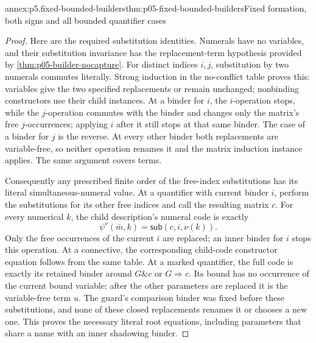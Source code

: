 \begin{annexitem}{annex:p5.fixed-bounded-builders}{thm:p05-fixed-bounded-builders}{Fixed formation, both signs and all bounded quantifier cases}
\begin{proof}
Here are the required substitution identities. Numerals have no variables,
and their substitution invariance has the replacement-term hypothesis
provided by \cref{thm:p05-builder-nocapture}. For distinct indices
\(i,j\), substitution by two numerals commutes literally. Strong
induction in the no-conflict table proves this: variables give the two
specified replacements or remain unchanged; nonbinding constructors use
their child instances. At a binder for \(i\), the \(i\)-operation
stops, while the \(j\)-operation commutes with the binder and changes
only the matrix's free \(j\)-occurrences; applying \(i\) after it
still stops at that same binder. The case of a binder for \(j\) is
the reverse. At every other binder both replacements are variable-free,
so neither operation renames it and the matrix induction instance
applies. The same argument covers terms.

Consequently any prescribed finite order of the free-index substitutions
has its literal simultaneous-numeral value. At a quantifier with current
binder \(i\), perform the substitutions for its other free indices
and call the resulting matrix \(c\). For every numerical \(k\),
the child description's numeral code is exactly
\[
                       \psi^\nu(\bar m,k)=\mathsf{sub}(c,i,\nu(k)).
\tag{8}
\]
Only the free occurrences of the current \(i\) are replaced; an
inner binder for \(i\) stops this operation. At a connective, the
corresponding child-code constructor equation follows from the same
table. At a marked quantifier, the full code is exactly its retained
binder around \(G\mathbin{\&}c\) or \(G\Rightarrow c\).
Its bound has no occurrence of the current bound variable; after the
other parameters are replaced it is the variable-free term \(u\).
The guard's comparison binder was fixed before these substitutions,
and none of these closed replacements renames it or chooses a new one.
This proves the necessary literal root equations, including parameters
that share a name with an inner shadowing binder.


\end{proof}
\end{annexitem}
